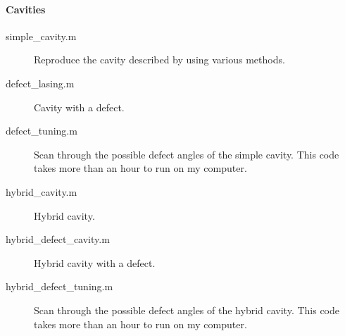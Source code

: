 \paragraph{Cavities}

\begin{description}
	\item[simple_cavity.m] Reproduce the cavity described by \textcite{topf_modes_2014} using various methods.
	\item[defect_lasing.m] Cavity with a defect.
	\item[defect_tuning.m] Scan through the possible defect angles of the simple cavity. This code takes more than an hour to run on my computer.
	\item[hybrid_cavity.m] Hybrid cavity.
	\item[hybrid_defect_cavity.m] Hybrid cavity with a defect.
	\item[hybrid_defect_tuning.m] Scan through the possible defect angles of the hybrid cavity. This code takes more than an hour to run on my computer.
\end{description}